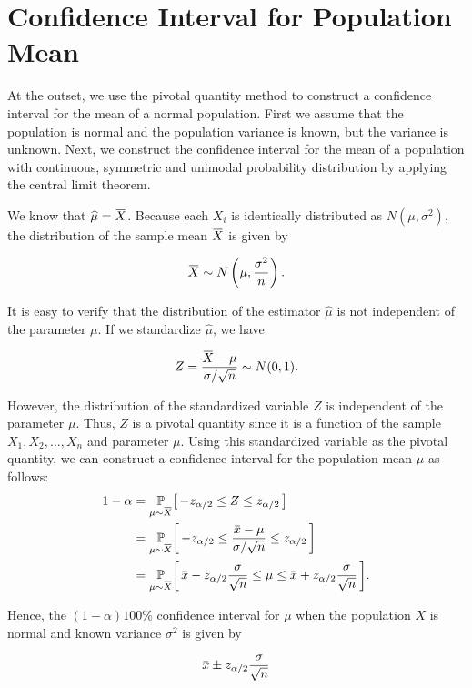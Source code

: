 \section{Confidence Interval for Population Mean}

At the outset, we use the pivotal quantity method to construct a confidence interval for the mean of a normal population. 
First we assume that the population is normal and the population variance is known, but the variance is unknown. Next, we
 construct the confidence interval for the mean of a population with continuous,
 symmetric and unimodal probability distribution by applying the central
 limit theorem.

We know that $\widehat{\mu} = \ols{X}$. Because each $X_i$ is identically distributed as $N(\mu, \sigma^2)$,
the distribution of the sample mean $\ols{X}$ is given by

\[
\ols{X} \sim N\left(\mu, \frac{\sigma^2}{n}\right).
\]

It is easy to verify that the distribution of the estimator $\widehat{\mu}$ is not independent of the parameter $\mu$. 
If we standardize $\widehat{\mu}$, we have

\[
Z = \frac{\ols{X} - \mu}{\sigma / \sqrt{n}} \sim N(0, 1).
\]

However, the distribution of the standardized variable $Z$ is independent of the parameter $\mu$. Thus, $Z$ is a pivotal quantity
since it is a function of the sample $X_1, X_2, \ldots, X_n$ and parameter $\mu$. Using this 
standardized variable as the pivotal quantity, we can construct a confidence interval for the population mean $\mu$
as follows:
\begin{align*}
    1 - \alpha &= \uprob[\mu \sim \ols{X}]{-z_{\alpha / 2} \leq Z \leq z_{\alpha/2} }\\
    &= \uprob[\mu \sim \ols{X}]{ -z_{\alpha / 2} \leq \frac{\ols{x} - \mu}{\sigma / \sqrt{n}} \leq z_{\alpha/2} }\\
    &= \uprob[\mu \sim \ols{X}]{ \ols{x} - z_{\alpha / 2} \frac{\sigma}{\sqrt{n}} \leq \mu \leq \ols{x} + z_{\alpha/2} \frac{\sigma}{\sqrt{n}} }.
\end{align*}

Hence, the $(1-\alpha)100\%$ confidence interval for $\mu$ when the population $X$ is normal 
and known variance $\sigma^2$ is given by

\begin{equation}
    \ols{x} \pm z_{\alpha / 2} \frac{\sigma}{\sqrt{n}}
\end{equation}

